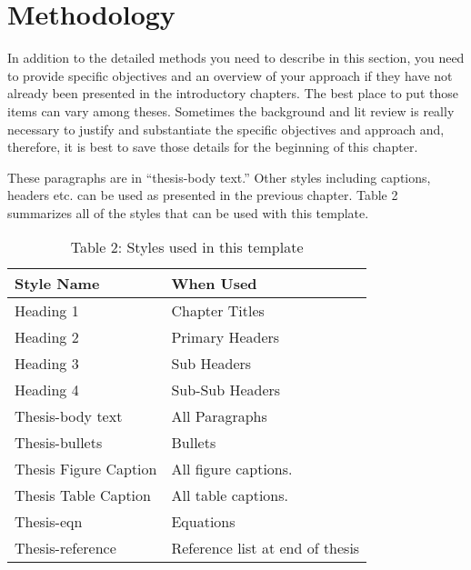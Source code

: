 \chapter{Methodology} \label{chapterMethodology}

In addition to the detailed methods you need to describe in this section, you need to provide specific objectives and an overview of your approach if they have not already been presented in the introductory chapters.  The best place to put those items can vary among theses.  Sometimes the background and lit review is really necessary to justify and substantiate the specific objectives and approach and, therefore, it is best to save those details for the beginning of this chapter.

These paragraphs are in “thesis-body text.”  Other styles including captions, headers etc. can be used as presented in the previous chapter.  Table 2 summarizes all of the styles that can be used with this template.

\begin{table}[ht]
  \centering
  \begin{tabularx}{0.8\textwidth} {
    | >{\centering\arraybackslash}X 
    | >{\centering\arraybackslash}X |
  }
    \hline
      Style Name & When Used \\ 
    \hline\hline
      Heading 1 & Chapter Titles \\
      Heading 2 & Primary Headers \\
      Heading 3 & Sub Headers \\
      Heading 4 & Sub-Sub Headers \\
      Thesis-body text & All Paragraphs \\
      Thesis-bullets & Bullets \\
      Thesis Figure Caption & All figure captions. \\
      Thesis Table Caption & All table captions. \\
      Thesis-eqn & Equations \\
      Thesis-reference & Reference list at end of thesis \\
    \hline
  \end{tabularx}
  \caption{Table 2: Styles used in this template}
  \label{table:2}
\end{table}
